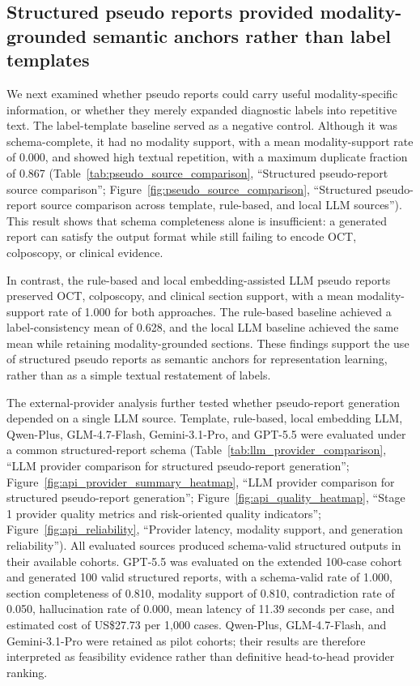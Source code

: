 \subsection{Structured pseudo reports provided modality-grounded semantic anchors rather than label templates}
\label{subsec:pseudo_report_results}

We next examined whether pseudo reports could carry useful modality-specific information, or whether they merely expanded diagnostic labels into repetitive text. The label-template baseline served as a negative control. Although it was schema-complete, it had no modality support, with a mean modality-support rate of 0.000, and showed high textual repetition, with a maximum duplicate fraction of 0.867 (Table~\ref{tab:pseudo_source_comparison}, ``Structured pseudo-report source comparison''; Figure~\ref{fig:pseudo_source_comparison}, ``Structured pseudo-report source comparison across template, rule-based, and local LLM sources''). This result shows that schema completeness alone is insufficient: a generated report can satisfy the output format while still failing to encode OCT, colposcopy, or clinical evidence.

In contrast, the rule-based and local embedding-assisted LLM pseudo reports preserved OCT, colposcopy, and clinical section support, with a mean modality-support rate of 1.000 for both approaches. The rule-based baseline achieved a label-consistency mean of 0.628, and the local LLM baseline achieved the same mean while retaining modality-grounded sections. These findings support the use of structured pseudo reports as semantic anchors for representation learning, rather than as a simple textual restatement of labels.

The external-provider analysis further tested whether pseudo-report generation depended on a single LLM source. Template, rule-based, local embedding LLM, Qwen-Plus, GLM-4.7-Flash, Gemini-3.1-Pro, and GPT-5.5 were evaluated under a common structured-report schema (Table~\ref{tab:llm_provider_comparison}, ``LLM provider comparison for structured pseudo-report generation''; Figure~\ref{fig:api_provider_summary_heatmap}, ``LLM provider comparison for structured pseudo-report generation''; Figure~\ref{fig:api_quality_heatmap}, ``Stage 1 provider quality metrics and risk-oriented quality indicators''; Figure~\ref{fig:api_reliability}, ``Provider latency, modality support, and generation reliability''). All evaluated sources produced schema-valid structured outputs in their available cohorts. GPT-5.5 was evaluated on the extended 100-case cohort and generated 100 valid structured reports, with a schema-valid rate of 1.000, section completeness of 0.810, modality support of 0.810, contradiction rate of 0.050, hallucination rate of 0.000, mean latency of 11.39 seconds per case, and estimated cost of US\$27.73 per 1,000 cases. Qwen-Plus, GLM-4.7-Flash, and Gemini-3.1-Pro were retained as pilot cohorts; their results are therefore interpreted as feasibility evidence rather than definitive head-to-head provider ranking.

